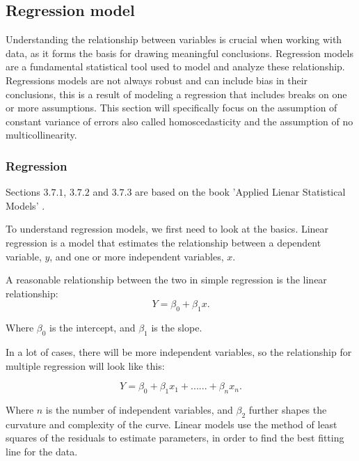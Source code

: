\subsection{Regression model}
Understanding the relationship between variables is crucial when working with data, as it forms the basis for drawing meaningful conclusions. Regression models are a fundamental statistical tool used to model and analyze these relationship. Regressions models are not always robust and can include bias in their conclusions, this is a result of modeling a regression that includes breaks on one or more assumptions. This section will specifically focus on the assumption of constant variance of errors also called homoscedasticity and the assumption of no multicollinearity.

\subsubsection{Regression}
Sections $3.7.1$, $3.7.2$ and $3.7.3$ are based on the book 'Applied Lienar Statistical Models' \cite{AppliedLSM}. 
\newline 

\noindent To understand regression models, we first need to look at the basics.\newline 
Linear regression is a model that estimates the relationship between a dependent variable, \( y \), and one or more independent variables, \( x \).

\noindent A reasonable relationship between the two in simple regression is the linear relationship:
\begin{equation}
Y = \beta_0 + \beta_1 x .
\end{equation}


\noindent Where \( \beta_0 \) is the intercept, and \( \beta_1 \) is the slope.

\noindent In a lot of cases, there will be more independent variables, so the relationship for multiple regression will look like this:

\begin{equation}
	Y = \beta_0 + \beta_1 x_1 + ......+ \beta_n x_n .
\end{equation}




\noindent Where \( n \) is the number of independent variables, and $\beta_2$ further shapes the curvature and complexity of the curve. Linear models use the method of least squares of the residuals to estimate parameters, in order to find the best fitting line for the data.

